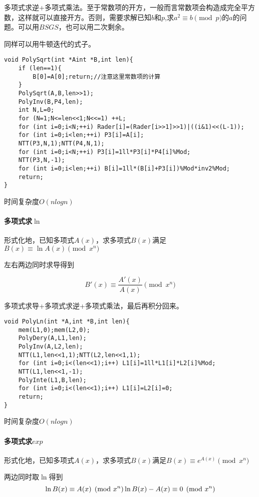 \documentclass[UTF-8]{ctexart}
\begin{document}
	多项式求逆+多项式乘法。至于常数项的开方，一般而言常数项会构造成完全平方数，这样就可以直接开方。否则，需要求解已知$b$和$p$,求$a^2 \equiv b \pmod{p}$的$a$的问题。可以用$BSGS$，也可以用二次剩余。
	
	同样可以用牛顿迭代的式子。
	
\begin{verbatim}
void PolySqrt(int *Aint *B,int len){
    if (len==1){
        B[0]=A[0];return;//注意这里常数项的计算
    }
    PolySqrt(A,B,len>>1);
    PolyInv(B,P4,len);
    int N,L=0;
    for (N=1;N<=len<<1;N<<=1) ++L;
    for (int i=0;i<N;++i) Rader[i]=(Rader[i>>1]>>1)|((i&1)<<(L-1));
    for (int i=0;i<len;++i) P3[i]=A[i];
    NTT(P3,N,1);NTT(P4,N,1);
    for (int i=0;i<N;++i) P3[i]=1ll*P3[i]*P4[i]%Mod;
    NTT(P3,N,-1);
    for (int i=0;i<len;++i) B[i]=1ll*(B[i]+P3[i])%Mod*inv2%Mod;
    return;
}
\end{verbatim}
	
	时间复杂度$O(nlogn)$
	
	\paragraph{多项式求$\ln$} 形式化地，已知多项式$A(x)$，求多项式$B(x)$满足$B(x) \equiv \ln{A(x)} \pmod{x^n}$  
	
	左右两边同时求导得到
	
	$$B'(x) \equiv \frac{A'(x)}{A(x)} \pmod{x^n}$$
	
	多项式求导+多项式求逆+多项式乘法，最后再积分回来。
	
\begin{verbatim}
void PolyLn(int *A,int *B,int len){
    mem(L1,0);mem(L2,0);
    PolyDery(A,L1,len);
    PolyInv(A,L2,len);
    NTT(L1,len<<1,1);NTT(L2,len<<1,1);
    for (int i=0;i<(len<<1);i++) L1[i]=1ll*L1[i]*L2[i]%Mod;
    NTT(L1,len<<1,-1);
    PolyInte(L1,B,len);
    for (int i=0;i<(len<<1);i++) L1[i]=L2[i]=0;
    return;
}
\end{verbatim}
	时间复杂度$O(nlogn)$
	
	\paragraph{多项式求$exp$}形式化地，已知多项式$A(x)$，求多项式$B(x)$满足$B(x) \equiv e^{A(x)} \pmod{x^n}$  
	
	两边同时取$\ln$得到
	$$\ln{B(x)} \equiv A(x) \pmod{x^n} \\\\ \ln{B(x)}-A(x) \equiv 0 \pmod{x^n}$$
	
\end{document}
